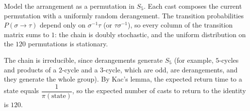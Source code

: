 Model the arrangement as a permutation in $S_5$. Each cast composes the current permutation with a uniformly random derangement. The transition probabilities $P(\sigma\to\tau)$ depend only on $\sigma^{-1}\tau$ (or $\tau\sigma^{-1}$), so every column of the transition matrix sums to $1$: the chain is doubly stochastic, and the uniform distribution on the $120$ permutations is stationary.

The chain is irreducible, since derangements generate $S_5$ (for example, $5$-cycles and products of a $2$-cycle and a $3$-cycle, which are odd, are derangements, and they generate the whole group). By Kac's lemma, the expected return time to a state equals $\dfrac1{\pi(\text{state})}$, so the expected number of casts to return to the identity is $\boxed{120}$.
